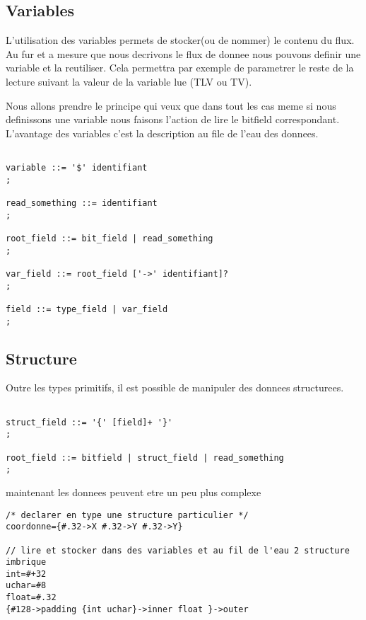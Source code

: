 \documentclass[11pt]{report}
\begin{document}
\subsection{Variables}

L'utilisation des variables permets de stocker(ou de nommer) le contenu du flux.
Au fur et a mesure que nous decrivons le flux de donnee nous pouvons definir une variable et la reutiliser. 
Cela permettra par exemple de parametrer le reste de la lecture suivant la valeur de la variable lue (TLV ou TV).

Nous allons prendre le principe qui veux que dans tout les cas meme si nous definissons une variable nous faisons l'action de lire le bitfield correspondant. 
L'avantage des variables c'est la description au file de l'eau des donnees.

\begin{lstlisting}

variable ::= '$' identifiant 
;

read_something ::= identifiant
;

root_field ::= bit_field | read_something
; 

var_field ::= root_field ['->' identifiant]?
;

field ::= type_field | var_field
;
\end{lstlisting} %

\subsection{Structure}

Outre les types primitifs, il est possible de manipuler des donnees structurees.

\begin{lstlisting}

struct_field ::= '{' [field]+ '}'
;

root_field ::= bitfield | struct_field | read_something
;
\end{lstlisting}

maintenant les donnees peuvent etre un peu plus complexe

\begin{lstlisting}
/* declarer en type une structure particulier */
coordonne={#.32->X #.32->Y #.32->Y}

// lire et stocker dans des variables et au fil de l'eau 2 structure imbrique
int=#+32
uchar=#8
float=#.32
{#128->padding {int uchar}->inner float }->outer
\end{lstlisting}
\end{document}
